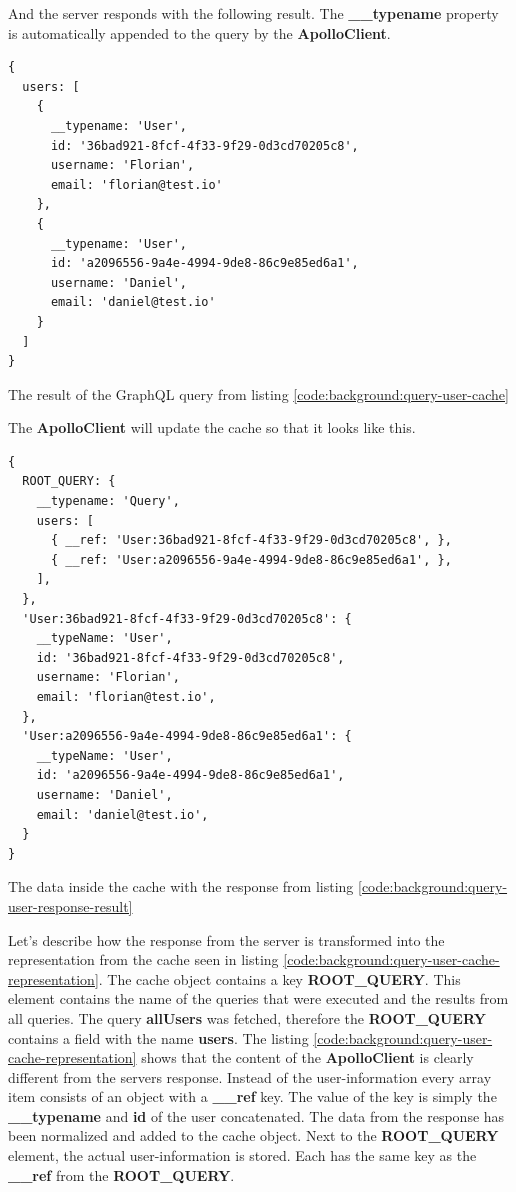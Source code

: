 And the server responds with the following result. The \textbf{\_\_typename} property is automatically appended to the query by the \textbf{ApolloClient}.

\ifshowListings
\begin{listing}[H]
\begin{verbatim}
{
  users: [
    {
      __typename: 'User',
      id: '36bad921-8fcf-4f33-9f29-0d3cd70205c8',
      username: 'Florian',
      email: 'florian@test.io'
    }, 
    {
      __typename: 'User',
      id: 'a2096556-9a4e-4994-9de8-86c9e85ed6a1',
      username: 'Daniel',
      email: 'daniel@test.io'
    }
  ]
}
\end{verbatim}
\caption{The result of the GraphQL query from listing \ref{code:background:query-user-cache}}\label{code:background:query-user-response-result}
\end{listing}
\fi

The \textbf{ApolloClient} will update the cache so that it looks like this.

\ifshowListings
\begin{listing}[H]
\begin{verbatim}
{
  ROOT_QUERY: {
    __typename: 'Query',
    users: [
      { __ref: 'User:36bad921-8fcf-4f33-9f29-0d3cd70205c8', },
      { __ref: 'User:a2096556-9a4e-4994-9de8-86c9e85ed6a1', },
    ],
  },
  'User:36bad921-8fcf-4f33-9f29-0d3cd70205c8': {
    __typeName: 'User',
    id: '36bad921-8fcf-4f33-9f29-0d3cd70205c8',
    username: 'Florian',
    email: 'florian@test.io',
  },
  'User:a2096556-9a4e-4994-9de8-86c9e85ed6a1': {
    __typeName: 'User',
    id: 'a2096556-9a4e-4994-9de8-86c9e85ed6a1',
    username: 'Daniel',
    email: 'daniel@test.io',
  }
}
\end{verbatim}
\caption{The data inside the cache with the response from listing \ref{code:background:query-user-response-result}}\label{code:background:query-user-cache-representation}
\end{listing}
\fi

Let's describe how the response from the server is transformed into the representation from the cache seen in listing \ref{code:background:query-user-cache-representation}. The cache object contains a key \textbf{ROOT\_QUERY}. This element contains the name of the queries that were executed and the results from all queries. The query \textbf{allUsers} was fetched, therefore the \textbf{ROOT\_QUERY} contains a field with the name \textbf{users}. The listing \ref{code:background:query-user-cache-representation} shows that the content of the \textbf{ApolloClient} is clearly different from the servers response. Instead of the user-information every array item consists of an object with a \textbf{\_\_ref} key. The value of the key is simply the \textbf{\_\_typename} and \textbf{id} of the user concatenated. The data from the response has been normalized and added to the cache object. Next to the \textbf{ROOT\_QUERY} element, the actual user-information is stored. Each has the same key as the \textbf{\_\_ref} from the \textbf{ROOT\_QUERY}. 

